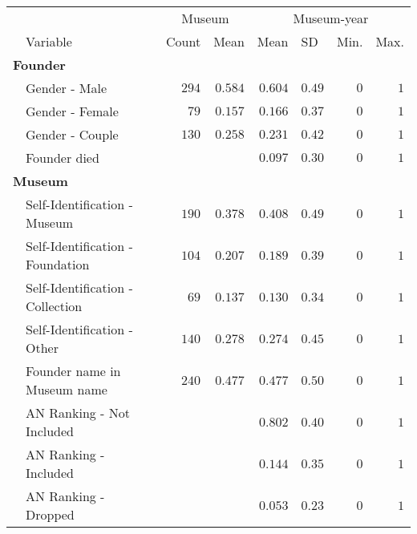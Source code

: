 \documentclass[12pt]{article}
\begin{document}
\begin{table}[ht]
\centering
\begin{tabular}{llrrrrrr}
  \hline
 & & \multicolumn{2}{c}{Museum} & \multicolumn{4}{c}{Museum-year} \\ 
  \cmidrule(r){3-4}\cmidrule(r){5-8}
  \multicolumn{1}{l}{} & \multicolumn{1}{l}{Variable} & \multicolumn{1}{l}{Count} & \multicolumn{1}{l}{Mean} & \multicolumn{1}{l}{Mean} & \multicolumn{1}{l}{SD} & \multicolumn{1}{l}{Min.} & \multicolumn{1}{l}{Max.}\\ 
 \hline
  \multicolumn{8}{l}{\textbf{Founder}}                                                          \\ 
 & Gender - Male                    & $294$ & $0.584$ & $0.604$ & $0.49$ & $0$        & $1$     \\ 
 & Gender - Female                  & $79$  & $0.157$ & $0.166$ & $0.37$ & $0$        & $1$     \\ 
 & Gender - Couple                  & $130$ & $0.258$ & $0.231$ & $0.42$ & $0$        & $1$     \\ 
 & Founder died                     &       &         & $0.097$ & $0.30$ & $0$        & $1$     \\ 
   \multicolumn{8}{l}{\textbf{Museum}}                                                          \\ 
 & Self-Identification - Museum     & $190$ & $0.378$ & $0.408$ & $0.49$ & $0$        & $1$     \\ 
 & Self-Identification - Foundation & $104$ & $0.207$ & $0.189$ & $0.39$ & $0$        & $1$     \\ 
 & Self-Identification - Collection & $69$  & $0.137$ & $0.130$ & $0.34$ & $0$        & $1$     \\ 
 & Self-Identification - Other      & $140$ & $0.278$ & $0.274$ & $0.45$ & $0$        & $1$     \\ 
 & Founder name in Museum name      & $240$ & $0.477$ & $0.477$ & $0.50$ & $0$        & $1$     \\ 
 & AN Ranking - Not Included        &       &         & $0.802$ & $0.40$ & $0$        & $1$     \\ 
 & AN Ranking - Included            &       &         & $0.144$ & $0.35$ & $0$        & $1$     \\ 
 & AN Ranking - Dropped             &       &         & $0.053$ & $0.23$ & $0$        & $1$     \\ 

\end{tabular}
\end{table}
\end{document}

